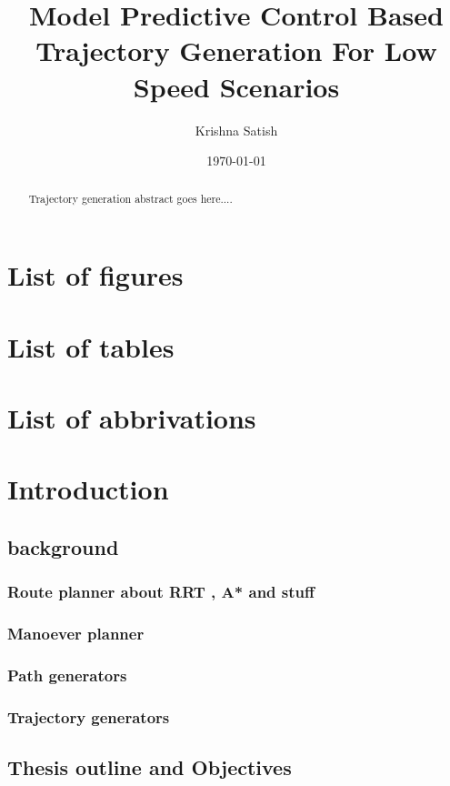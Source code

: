 \documentclass{article}
\title{Model Predictive Control Based Trajectory Generation For Low Speed Scenarios}
\author{Krishna Satish}
\date{\today}
\begin{document}
\maketitle
\newpage
\begin{abstract}
    Trajectory generation abstract goes here....
\end{abstract}
\newpage
\tableofcontents



\begin{titlepage}
    \section{List of figures}
    \section{List of tables}
    \section{List of abbrivations}

    \section{Introduction}
    \subsection{background}
    
    \subsubsection{Route planner about RRT , A* and stuff}
    \subsubsection{Manoever planner}
    \subsubsection{Path generators}
    \subsubsection{Trajectory generators}
    \subsection{Thesis outline and Objectives}


\end{titlepage}
\end{document}
